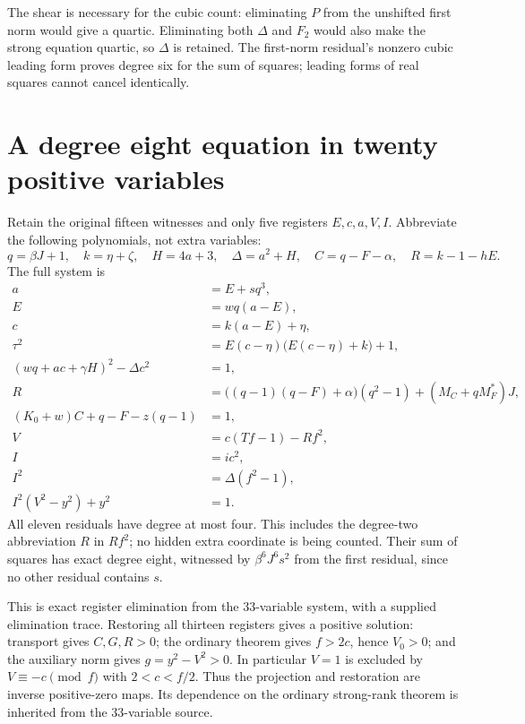 \documentclass[11pt]{article}
\begin{document}
The shear is necessary for the cubic count: eliminating $P$ from the unshifted first norm would give a quartic. Eliminating both $\Delta$ and $F_2$ would also make the strong equation quartic, so $\Delta$ is retained. The first-norm residual's nonzero cubic leading form proves degree six for the sum of squares; leading forms of real squares cannot cancel identically.

\section{A degree eight equation in twenty positive variables}\label{sec:octic}

Retain the original fifteen witnesses and only five registers $E,c,a,V,I$.
Abbreviate the following polynomials, not extra variables:
\[
q=\beta J+1,\quad k=\eta+\zeta,\quad H=4a+3,\quad
\Delta=a^2+H,\quad C=q-F-\alpha,\quad R=k-1-hE.
\]
The full system is
\begin{align}
a&=E+sq^3,\\
E&=wq(a-E),\\
c&=k(a-E)+\eta,\\
\tau^2&=E(c-\eta)\big(E(c-\eta)+k\big)+1,\\
(wq+ac+\gamma H)^2-\Delta c^2&=1,\\
R&=\big((q-1)(q-F)+\alpha\big)(q^2-1)+(M_C+qM_F^*)J,\\
(K_0+w)C+q-F-z(q-1)&=1,\\
V&=c(Tf-1)-Rf^2,\\
I&=ic^2,\\
I^2&=\Delta(f^2-1),\\
I^2(V^2-y^2)+y^2&=1.
\end{align}
All eleven residuals have degree at most four. This includes the degree-two abbreviation $R$ in $Rf^2$; no hidden extra coordinate is being counted. Their sum of squares has exact degree eight, witnessed by $\beta^6J^6s^2$ from the first residual, since no other residual contains $s$.

This is exact register elimination from the 33-variable system, with a supplied elimination trace. Restoring all thirteen registers gives a positive solution: transport gives $C,G,R>0$; the ordinary theorem gives $f>2c$, hence $V_0>0$; and the auxiliary norm gives $g=y^2-V^2>0$. In particular $V=1$ is excluded by $V\equiv-c\pmod f$ with $2<c<f/2$. Thus the projection and restoration are inverse positive-zero maps. Its dependence on the ordinary strong-rank theorem is inherited from the 33-variable source.
\end{document}

